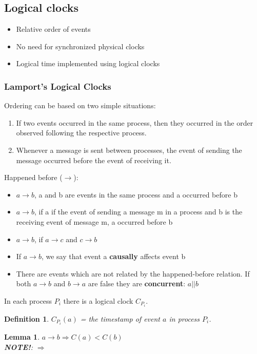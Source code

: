 \documentclass[a4paper]{article}
\newtheorem{definition}{Definition}
\newtheorem{lemma}{Lemma}
\begin{document}
\subsection{Logical clocks}
\begin{itemize}
	\item Relative order of events
	\item No need for synchronized physical clocks
	\item Logical time implemented using logical clocks
\end{itemize}
\subsubsection{Lamport's Logical Clocks}
Ordering can be based on two simple situations:
\begin{enumerate}
	\item If two events occurred in the same process, then they occurred in
		the order observed following the respective process.
	\item Whenever a message is sent between processes, the event of sending
		the message occurred before the event of receiving it.
\end{enumerate}
Happened before ($\rightarrow$):
\begin{itemize}
	\item $a\rightarrow b$, a and b are events in the same process and a
		occurred before b
	\item $a\rightarrow b$, if a if the event of sending a message m in a
		process and b is the receiving event of message m, a occurred
		before b
	\item $a\rightarrow b$, if $a\rightarrow c$ and $c\rightarrow b$
	\item If $a\rightarrow b$, we say that event a \textbf{causally} affects event b
	\item There are events which are not related by the
	happened-before relation. If both $a\rightarrow b$ and
	$b\rightarrow a$ are false they are \textbf{concurrent}: $a || b$
\end{itemize}
In each process $P_i$ there is a logical clock $C_{P_i}$.
\begin{definition}
	$C_{P_i}(a)$ = the timestamp of event $a$ in process $P_i$.
\end{definition}
\begin{lemma}
	$a\rightarrow b \Rightarrow C(a)<C(b)$ \\
	\textbf{NOTE!}: $\Rightarrow$
\end{lemma}
\end{document}
